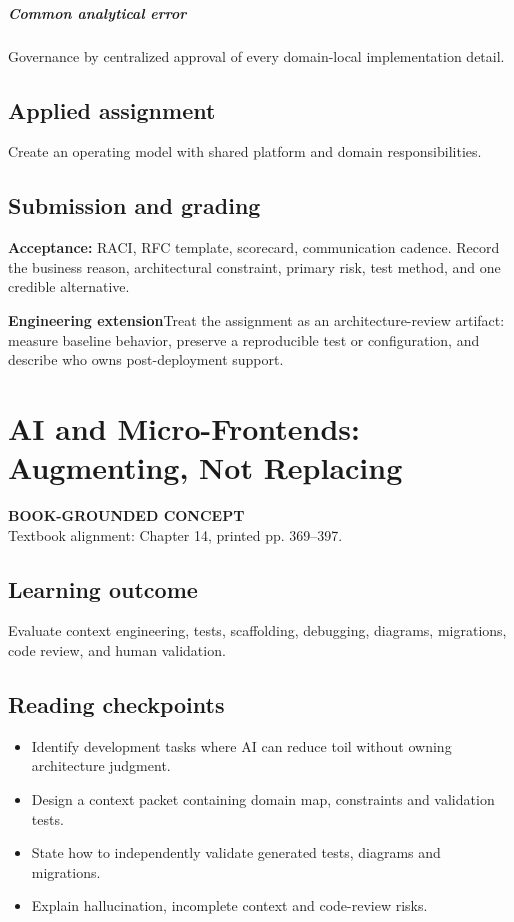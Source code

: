 \documentclass[11pt,letterpaper,oneside]{report}
\newcommand{\based}[1]{\begin{sourcebox}\textbf{BOOK-GROUNDED CONCEPT}\\#1\end{sourcebox}}
\newcommand{\criterion}[1]{\textbf{Acceptance:} #1}
\begin{document}
\paragraph{Common analytical error} Governance by centralized approval of every domain-local implementation detail.
\section{Applied assignment}
Create an operating model with shared platform and domain responsibilities.
\section{Submission and grading}
\criterion{RACI, RFC template, scorecard, communication cadence. Record the business reason, architectural constraint, primary risk, test method, and one credible alternative.}
\begin{engineerbox}\textbf{Engineering extension}\newline Treat the assignment as an architecture-review artifact: measure baseline behavior, preserve a reproducible test or configuration, and describe who owns post-deployment support.\end{engineerbox}

\chapter{AI and Micro-Frontends: Augmenting, Not Replacing}
\based{Textbook alignment: Chapter 14, printed pp. 369--397.}
\section{Learning outcome}
Evaluate context engineering, tests, scaffolding, debugging, diagrams, migrations, code review, and human validation.
\section{Reading checkpoints}
\begin{itemize}\item Identify development tasks where AI can reduce toil without owning architecture judgment.
\item Design a context packet containing domain map, constraints and validation tests.
\item State how to independently validate generated tests, diagrams and migrations.
\item Explain hallucination, incomplete context and code-review risks.
\end{itemize}
\end{document}
